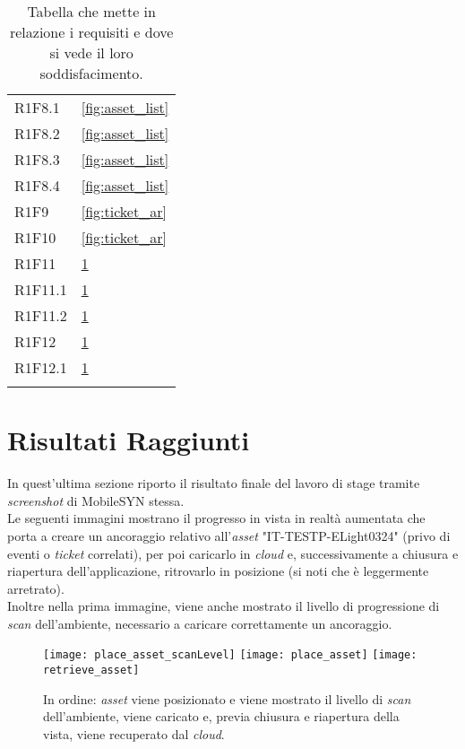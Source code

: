{\begin{longtable}{C{.3\freewidth} C{.4\freewidth}}
    R1F8.1 & \ref{fig:asset_list}\\
    R1F8.2 & \ref{fig:asset_list}\\
    R1F8.3 &\ref{fig:asset_list}\\
    R1F8.4 & \ref{fig:asset_list}\\
    R1F9 & \ref{fig:ticket_ar}\\
    R1F10 &\ref{fig:ticket_ar}\\ 
    R1F11 &\ref{fig:place_asset} \\
    R1F11.1 & \ref{fig:place_asset}\\
    R1F11.2 & \ref{fig:place_asset}\\
    R1F12 & \ref{fig:place_asset}\\
    R1F12.1 & \ref{fig:place_asset}\\
    
    \bottomrule
    \caption[Tabella requisiti - chi li soddisfa]{Tabella che mette in relazione i requisiti e dove si vede il loro soddisfacimento.}
    \end{longtable}
}

\section{Risultati Raggiunti}
In quest'ultima sezione riporto il risultato finale del lavoro di stage tramite \textit{screenshot} di MobileSYN stessa.\\
Le seguenti immagini mostrano il progresso in vista in realtà aumentata che porta a creare un ancoraggio relativo all'\textit{asset} "IT-TESTP-ELight0324" (privo di eventi o \textit{ticket} correlati), per poi caricarlo in \textit{cloud} e, successivamente a chiusura e riapertura dell'applicazione, ritrovarlo in posizione (si noti che è leggermente arretrato).\\
Inoltre nella prima immagine, viene anche mostrato il livello di progressione di \textit{scan} dell'ambiente, necessario a caricare correttamente un ancoraggio.

\begin{figure}[H]
  \centering
  \texttt{[image: place\_asset\_scanLevel]}\hfill
  \texttt{[image: place\_asset]}\hfill
  \texttt{[image: retrieve\_asset]}\hfill

  \caption[Creazione, caricamento e recupero di \textit{asset}]{In ordine: \textit{asset} viene posizionato e viene mostrato il livello di \textit{scan} dell'ambiente, viene caricato e, previa chiusura e riapertura della vista, viene recuperato dal \textit{cloud}.}
  \label{fig:place_asset}
\end{figure}

